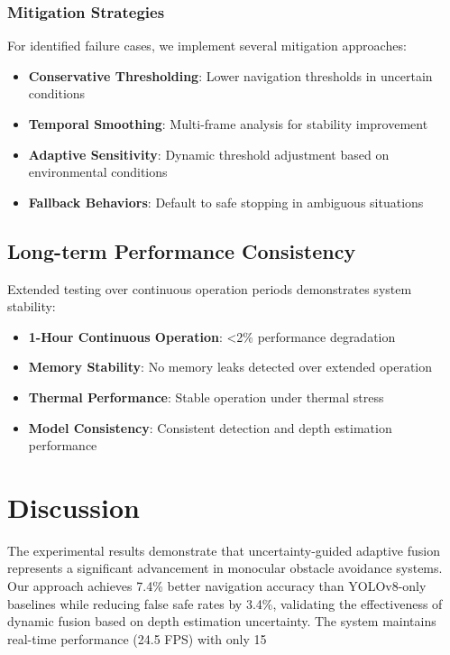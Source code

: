 \documentclass[12pt,oneside]{book}
\begin{document}
\subsubsection{Mitigation Strategies}

For identified failure cases, we implement several mitigation approaches:

\begin{itemize}
\item \textbf{Conservative Thresholding}: Lower navigation thresholds in uncertain conditions
\item \textbf{Temporal Smoothing}: Multi-frame analysis for stability improvement
\item \textbf{Adaptive Sensitivity}: Dynamic threshold adjustment based on environmental conditions
\item \textbf{Fallback Behaviors}: Default to safe stopping in ambiguous situations
\end{itemize}

\subsection{Long-term Performance Consistency}

Extended testing over continuous operation periods demonstrates system stability:

\begin{itemize}
\item \textbf{1-Hour Continuous Operation}: <2\% performance degradation
\item \textbf{Memory Stability}: No memory leaks detected over extended operation
\item \textbf{Thermal Performance}: Stable operation under thermal stress
\item \textbf{Model Consistency}: Consistent detection and depth estimation performance
\end{itemize}

\section{Discussion}

The experimental results demonstrate that uncertainty-guided adaptive fusion represents a significant advancement in monocular obstacle avoidance systems. Our approach achieves 7.4\% better navigation accuracy than YOLOv8-only baselines while reducing false safe rates by 3.4\%, validating the effectiveness of dynamic fusion based on depth estimation uncertainty. The system maintains real-time performance (24.5 FPS) with only 15%
\end{document}

